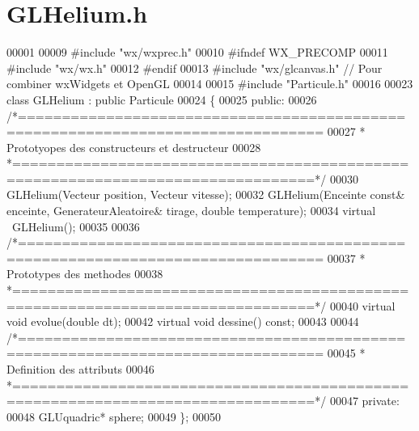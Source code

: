 \section{G\+L\+Helium.\+h}
\label{_g_l_helium_8h_source}

\begin{DoxyCode}
00001 
00009 \textcolor{preprocessor}{#include "wx/wxprec.h"}
00010 \textcolor{preprocessor}{#ifndef WX\_PRECOMP}
00011 \textcolor{preprocessor}{#include "wx/wx.h"}
00012 \textcolor{preprocessor}{#endif}
00013 \textcolor{preprocessor}{#include "wx/glcanvas.h"} \textcolor{comment}{// Pour combiner wxWidgets et OpenGL}
00014 
00015 \textcolor{preprocessor}{#include "Particule.h"}
00016 
00023 \textcolor{keyword}{class }GLHelium : \textcolor{keyword}{public} Particule
00024 \{
00025     \textcolor{keyword}{public}:
00026 \textcolor{comment}{/*================================================================================}
00027 \textcolor{comment}{ * Prototyopes des constructeurs et destructeur}
00028 \textcolor{comment}{ *================================================================================*/}
00030     GLHelium(Vecteur position, Vecteur vitesse);
00032     GLHelium(Enceinte \textcolor{keyword}{const}& enceinte, GenerateurAleatoire& tirage, \textcolor{keywordtype}{double} temperature);
00034     \textcolor{keyword}{virtual} ~GLHelium();
00035     
00036 \textcolor{comment}{/*================================================================================}
00037 \textcolor{comment}{ * Prototypes des methodes}
00038 \textcolor{comment}{ *================================================================================*/}
00040     \textcolor{keyword}{virtual} \textcolor{keywordtype}{void} evolue(\textcolor{keywordtype}{double} dt);
00042     \textcolor{keyword}{virtual} \textcolor{keywordtype}{void} dessine() \textcolor{keyword}{const};
00043     
00044 \textcolor{comment}{/*================================================================================}
00045 \textcolor{comment}{ * Definition des attributs}
00046 \textcolor{comment}{ *================================================================================*/}
00047     \textcolor{keyword}{private}:
00048     GLUquadric* sphere;
00049 \};
00050 
\end{DoxyCode}
